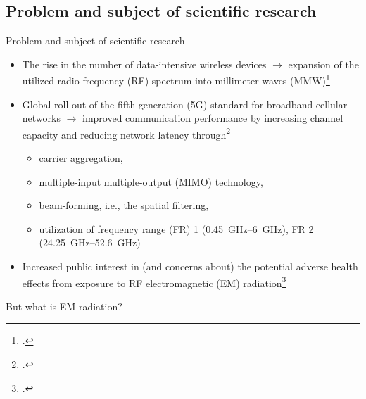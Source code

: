 \documentclass[xcolor=dvipsnames,10pt]{beamer}
\begin{document}
\subsection{Problem and subject of scientific research}
\begin{frame}{Problem and subject of scientific research}
    \begin{itemize}
        \item The rise in the number of data-intensive wireless devices $\rightarrow$ expansion of the utilized radio frequency (RF) spectrum into millimeter waves (MMW)\footcite{Rappaport2013Millimeter}
        \item Global roll-out of the fifth-generation (5G) standard for broadband cellular networks $\rightarrow$ improved communication performance by increasing channel capacity and reducing network latency through\footcite{Andrews2014What}
        \begin{itemize}
            \item carrier aggregation,
            \item multiple-input multiple-output (MIMO) technology,
            \item beam-forming, i.e., the spatial filtering,
            \item utilization of frequency range (FR) 1 (\SIrange{0.45}{6}{\GHz}), FR 2 (\SIrange{24.25}{52.6}{\GHz})
        \end{itemize}
        \item Increased public interest in (and concerns about) the potential adverse health effects from exposure to RF electromagnetic (EM) radiation\footcite{Wu2015Safe}
    \end{itemize}
\end{frame}

\begin{frame}{But what is EM radiation?}
    
\end{frame}
\end{document}
